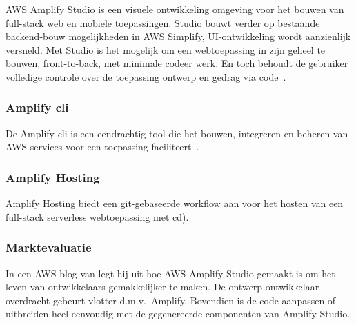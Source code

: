 AWS Amplify Studio is een visuele ontwikkeling omgeving voor het bouwen van full-stack web en mobiele toepassingen.
Studio bouwt verder op bestaande backend-bouw mogelijkheden in AWS Simplify, UI-ontwikkeling wordt aanzienlijk versneld.
Met Studio is het mogelijk om een webtoepassing in zijn geheel te bouwen, front-to-back, met minimale codeer werk.
En toch behoudt de gebruiker volledige controle over de toepassing ontwerp en gedrag via code~\autocite{AWSAmplifyDocs}.

\subsubsection{Amplify \acrshort{cli}}

De Amplify \acrfull{cli} is een eendrachtig tool die het bouwen, integreren en beheren van AWS-services voor een toepassing faciliteert~\autocite{AWSAmplifyDocs}.

\subsubsection{Amplify Hosting}


Amplify Hosting biedt een git-gebaseerde workflow aan voor het hosten van een full-stack serverless webtoepassing met \acrfull{cd}).

\subsubsection{Marktevaluatie}


In een AWS blog van \textcite{Spittel2022} legt hij uit hoe AWS Amplify Studio gemaakt is om het leven van ontwikkelaars gemakkelijker te maken.
De ontwerp-ontwikkelaar overdracht gebeurt vlotter d.m.v.\ Amplify.
Bovendien is de code aanpassen of uitbreiden heel eenvoudig met de gegenereerde componenten van Amplify Studio.

